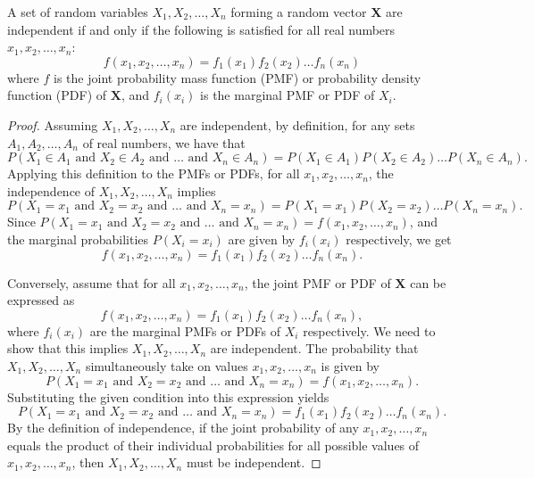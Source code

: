 \begin{proposition}
A set of random variables \(X_1, X_2, \ldots, X_n\) forming a random vector \(\mathbf{X}\) are independent if and only if the following is satisfied for all real numbers \(x_1, x_2, \ldots, x_n\): 
\[
f\left(x_1, x_2, \ldots, x_n\right) = f_1\left(x_1\right) f_2\left(x_2\right) \ldots f_n\left(x_n\right)
\]
where \(f\) is the joint probability mass function (PMF) or probability density function (PDF) of \(\mathbf{X}\), and \(f_i(x_i)\) is the marginal PMF or PDF of \(X_i\).
\end{proposition}

\begin{proof}
Assuming \(X_1, X_2, \ldots, X_n\) are independent, by definition, for any sets \(A_1, A_2, \ldots, A_n\) of real numbers, we have that 
\[
P(X_1 \in A_1 \text{ and } X_2 \in A_2 \text{ and } \ldots \text{ and } X_n \in A_n) = P(X_1 \in A_1)P(X_2 \in A_2)\ldots P(X_n \in A_n).
\]
Applying this definition to the PMFs or PDFs, for all \(x_1, x_2, \ldots, x_n\), the independence of \(X_1, X_2, \ldots, X_n\) implies 
\[
P(X_1 = x_1 \text{ and } X_2 = x_2 \text{ and } \ldots \text{ and } X_n = x_n) = P(X_1 = x_1)P(X_2 = x_2)\ldots P(X_n = x_n).
\]
Since \(P(X_1 = x_1 \text{ and } X_2 = x_2 \text{ and } \ldots \text{ and } X_n = x_n) = f(x_1, x_2, \ldots, x_n)\), and the marginal probabilities \(P(X_i = x_i)\) are given by \(f_i(x_i)\) respectively, we get 
\[
f(x_1, x_2, \ldots, x_n) = f_1(x_1) f_2(x_2) \ldots f_n(x_n).
\]

Conversely, assume that for all \(x_1, x_2, \ldots, x_n\), the joint PMF or PDF of \(\mathbf{X}\) can be expressed as 
\[
f(x_1, x_2, \ldots, x_n) = f_1(x_1) f_2(x_2) \ldots f_n(x_n),
\]
where \(f_i(x_i)\) are the marginal PMFs or PDFs of \(X_i\) respectively. We need to show that this implies \(X_1, X_2, \ldots, X_n\) are independent. The probability that \(X_1, X_2, \ldots, X_n\) simultaneously take on values \(x_1, x_2, \ldots, x_n\) is given by 
\[
P(X_1 = x_1 \text{ and } X_2 = x_2 \text{ and } \ldots \text{ and } X_n = x_n) = f(x_1, x_2, \ldots, x_n).
\]
Substituting the given condition into this expression yields 
\[
P(X_1 = x_1 \text{ and } X_2 = x_2 \text{ and } \ldots \text{ and } X_n = x_n) = f_1(x_1) f_2(x_2) \ldots f_n(x_n).
\]
By the definition of independence, if the joint probability of any \(x_1, x_2, \ldots, x_n\) equals the product of their individual probabilities for all possible values of \(x_1, x_2, \ldots, x_n\), then \(X_1, X_2, \ldots, X_n\) must be independent.
\end{proof}

